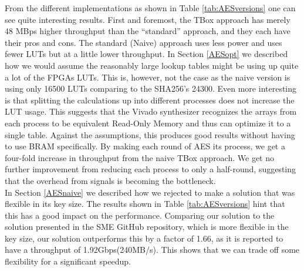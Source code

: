 \documentclass[a4paper, openany]{book}
\begin{document}
\begin{abstact}
From the different implementations as shown in Table \ref{tab:AESversions} one can see quite interesting results. First and foremost, the TBox approach has merely 48 MBps higher throughput than the ``standard'' approach, and they each have their pros and cons. The standard (Naive) approach uses less power and uses fewer LUTs but at a little lower throughput. In Section \ref{AESopt} we described how we would assume the reasonably large lookup tables might be using up quite a lot of the FPGAs LUTs. This is, however, not the case as the naive version is using only 16500 LUTs comparing to the SHA256's 24300. Even more interesting is that splitting the calculations up into different processes does not increase the LUT usage. This suggests that the Vivado synthesizer recognizes the arrays from each process to be equivalent Read-Only Memory and thus can optimize it to a single table. Against the assumptions, this produces good results without having to use BRAM specifically. By making each round of AES its process, we get a four-fold increase in throughput from the naive TBox approach. We get no further improvement from reducing each process to only a half-round, suggesting that the overhead from signals is becoming the bottleneck.\\
In Section \ref{AESnaive} we described how we rejected to make a solution that was flexible in its key size. The results shown in Table \ref{tab:AESversions} hint that this has a good impact on the performance. Comparing our solution to the solution presented in the SME GitHub repository, which is more flexible in the key size, our solution outperforms this by a factor of 1.66, as it is reported to have a throughput of 1.92Gbps(240MB/s)\cite{sme}. This shows that we can trade off some flexibility for a significant speedup.


\end{abstact}
\end{document}
